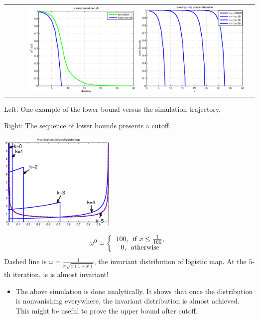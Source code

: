 \documentclass[dvips,landscape]{foils}
\renewcommand{\oursection}[1]{
\foilhead[-1.0cm]{#1}
}
\begin{document}
\newpage
\begin{tabular}{rl}%
\includegraphics[width=0.45\textwidth,trim=1cm 1cm 0cm 0cm]{logisticlowerbound}
\includegraphics[width=0.45\textwidth,trim=1cm 1cm 0cm 0cm]{asinlowerbound}
\end{tabular}


Left: One example of the lower bound versus the simulation trajectory. 

Right: The sequence of lower bounds presents a cutoff.
\newpage
\centerline{
\includegraphics[width=0.42\textwidth,trim=1cm 1cm 0cm 0cm]{logisticmapanalyticalsimulation}
}
\begin{eqnarray*}
\omega^0 = \left\{\begin{tabular}{c}
           100, \mbox{ if} $x \le\frac{1}{100}$,\\ 
           0, \mbox{ otherwise}
           \end{tabular}\right.
\end{eqnarray*}
Dashed line is $\omega = \frac{1}{\pi\sqrt{x(1-x)}} $, the invariant distribution of logistic map. At the $5$-th iteration, is is almost invariant! 
\newpage
\oursection{Conclusion}
\begin{itemize}
\item
The above simulation is done analytically. It shows that once the distribution is nonvanishing everywhere, the invariant distribution is almost achieved. This might be useful to prove the upper bound after cutoff. 
\end{itemize}
\end{document}
